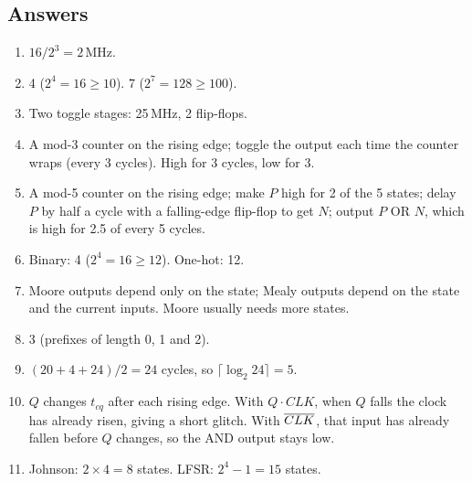 \subsection*{Answers}
\begin{enumerate}
  \item $16/2^3 = 2$\,MHz.
  \item 4 ($2^4 = 16 \ge 10$). 7 ($2^7 = 128 \ge 100$).
  \item Two toggle stages: 25\,MHz, 2 flip-flops.
  \item A mod-3 counter on the rising edge; toggle the output each time the counter wraps (every 3 cycles). High for 3 cycles, low for 3.
  \item A mod-5 counter on the rising edge; make $P$ high for 2 of the 5 states; delay $P$ by half a cycle with a falling-edge flip-flop to get $N$; output $P$ OR $N$, which is high for 2.5 of every 5 cycles.
  \item Binary: 4 ($2^4 = 16 \ge 12$). One-hot: 12.
  \item Moore outputs depend only on the state; Mealy outputs depend on the state and the current inputs. Moore usually needs more states.
  \item 3 (prefixes of length 0, 1 and 2).
  \item $(20 + 4 + 24)/2 = 24$ cycles, so $\lceil\log_2 24\rceil = 5$.
  \item $Q$ changes $t_{cq}$ after each rising edge. With $Q \cdot CLK$, when $Q$ falls the clock has already risen, giving a short glitch. With $\overline{CLK}$, that input has already fallen before $Q$ changes, so the AND output stays low.
  \item Johnson: $2 \times 4 = 8$ states. LFSR: $2^4 - 1 = 15$ states.
\end{enumerate}

